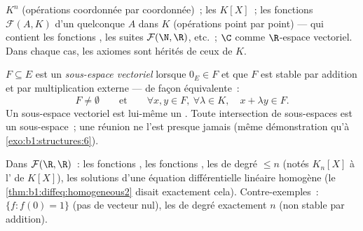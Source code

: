 \begin{example}\label{ex:b1:vspaces:examples}
$K^n$ (opérations coordonnée par coordonnée)~; les  $K[X]$~;
les fonctions $\mathcal{F}(A, K)$ d'un  quelconque $A$ dans
$K$ (opérations point par point) --- qui contient les fonctions
, les suites $\mathcal{F}(\N, \R)$, etc.~; $\C$ comme
$\R$-espace vectoriel. Dans chaque cas, les axiomes sont hérités de
ceux de $K$.
\end{example}

\begin{definition}\label{def:b1:vspaces:subspace}
$F \subseteq E$ est un \emph{sous-espace
vectoriel} lorsque $0_E \in F$ et que $F$
est stable par addition et par multiplication externe --- de façon
équivalente~:
\[
F \neq \emptyset
\qquad\text{et}\qquad
\forall x, y \in F,\ \forall \lambda \in K,\quad
x + \lambda y \in F .
\]
Un sous-espace vectoriel est lui-même un . Toute
intersection de sous-espaces est un sous-espace~; une réunion ne l'est
presque jamais (même démonstration qu'à
\cref{exo:b1:structures:6}).
\end{definition}

\begin{example}\label{ex:b1:vspaces:subspaces}
Dans $\mathcal{F}(\R, \R)$~: les fonctions , les fonctions
, les  de degré $\leq n$ (notés $K_n[X]$ à
l' de $K[X]$), les solutions d'une équation différentielle
linéaire homogène (le \cref{thm:b1:diffeq:homogeneous2} disait
exactement cela). Contre-exemples~: $\{f : f(0) = 1\}$ (pas de
vecteur nul), les  de degré exactement $n$ (non stable par
addition).
\end{example}

